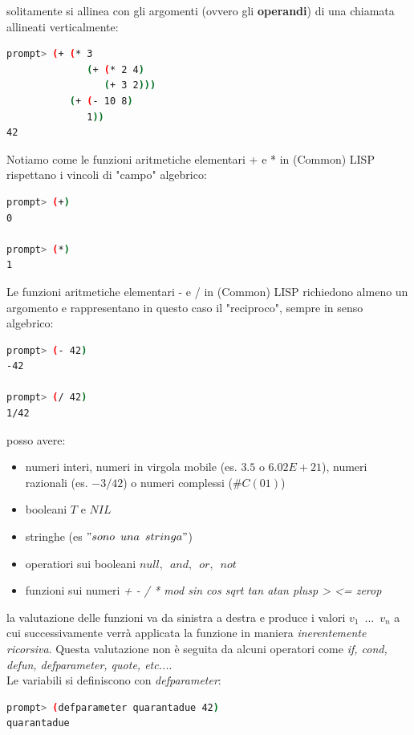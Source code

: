 \documentclass[a4paper,12pt, oneside]{book}
\begin{document}
solitamente si allinea con gli argomenti (ovvero gli \textbf{operandi}) di una chiamata allineati verticalmente:
\begin{shaded}
\begin{lstlisting}[language=bash]
prompt> (+ (* 3
              (+ (* 2 4)
                 (+ 3 2)))
           (+ (- 10 8)
              1))
42
\end{lstlisting}
\end{shaded}
Notiamo come le funzioni aritmetiche elementari + e * in (Common) LISP
rispettano i vincoli di "campo" algebrico:
\begin{shaded}
\begin{lstlisting}[language=bash]
prompt> (+)
0

prompt> (*)
1
\end{lstlisting}
\end{shaded}
Le funzioni aritmetiche elementari - e / in (Common) LISP richiedono almeno
un argomento e rappresentano in questo caso il "reciproco", sempre in senso
algebrico:
\begin{shaded}
\begin{lstlisting}[language=bash]
prompt> (- 42)
-42

prompt> (/ 42)
1/42
\end{lstlisting}
\end{shaded}
posso avere:
\begin{itemize}
\item numeri interi, numeri in virgola mobile (es. $3.5$ o $6.02E+21$), numeri razionali (es. $-3/42$) o numeri complessi ($\#C (0 1)$)
\item booleani $T$ e $NIL$
\item stringhe (es $"sono\,\,\, una \,\,\,stringa"$)
\item operatiori sui booleani $null,\,\,\,and,\,\,\, or,\,\,\,not$
\item funzioni sui numeri \textit{+ - / * mod sin cos sqrt tan atan plusp > <= zerop}
\end{itemize}
la valutazione delle funzioni va da sinistra a destra e produce i valori $v_1\,\,\,...\,\,\, v_n$ a cui successivamente verrà applicata la funzione in maniera \textit{inerentemente ricorsiva}. Questa valutazione non è seguita da alcuni operatori come \textit{if, cond, defun, defparameter, quote, etc...}.\\
Le variabili si definiscono con \textit{defparameter}:
\begin{shaded}
\begin{lstlisting}[language=bash]
prompt> (defparameter quarantadue 42)
quarantadue
\end{lstlisting}
\end{shaded}
\end{document}

